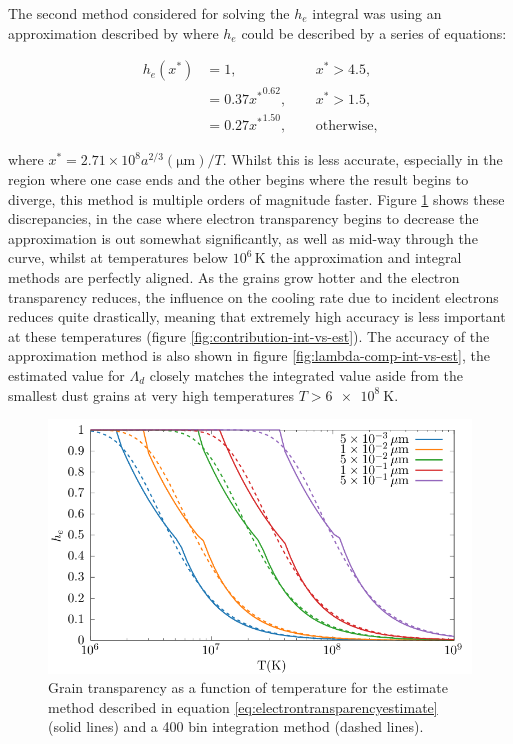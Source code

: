 
The second method considered for solving the $h_e$ integral was using an approximation described by \cite{dwek_infrared_1981} where $h_e$ could be described by a series of equations:

\begin{equation}
  \begin{alignedat}{3}
    h_e(x^*) & = 1 ,                && ~~ x^* > 4.5, \\
    & = 0.37{x^*}^{0.62} , && ~~ x^* > 1.5 , \\
    & = 0.27{x^*}^{1.50} , && ~~ \text{otherwise,}
  \end{alignedat} \label{eq:electrontransparencyestimate}
\end{equation}

\noindent
where $x^* = 2.71 \times 10^8 a^{2/3}(\si{\micro\metre}) /T$.
Whilst this is less accurate, especially in the region where one case ends and the other begins where the result begins to diverge, this method is multiple orders of magnitude faster.
Figure \ref{fig:graintransacc} shows these discrepancies, in the case where electron transparency begins to decrease the approximation is out somewhat significantly, as well as mid-way through the curve, whilst at temperatures below $10^6 \, \si{\kelvin}$ the approximation and integral methods are perfectly aligned.
As the grains grow hotter and the electron transparency reduces, the influence on the cooling rate due to incident electrons reduces quite drastically, meaning that extremely high accuracy is less important at these temperatures (figure \ref{fig:contribution-int-vs-est}).
The accuracy of the approximation method is also shown in figure \ref{fig:lambda-comp-int-vs-est}, the estimated value for $\Lambda_d$ closely matches the integrated value aside from the smallest dust grains at very high temperatures $T>\SI{6e8}{\kelvin}$.

\begin{figure}[h]
  \centering
  \includegraphics{assets/grain-transparency/grain-trans.pdf}
  \caption[Electron transparency method accuracy - $h_e$]{Grain transparency as a function of temperature for the estimate method described in equation \ref{eq:electrontransparencyestimate} (solid lines) and a 400 bin integration method (dashed lines).}
  \label{fig:graintransacc}
\end{figure}

